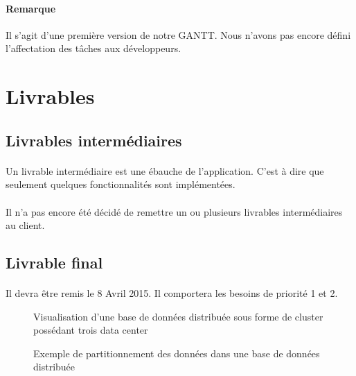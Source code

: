 \documentclass[12pt]{article}
\begin{document}
 \vspace{1cm}
 
\paragraph{Remarque} Il s'agit d'une première version de notre GANTT. Nous n'avons pas encore défini l'affectation des tâches aux développeurs.


\newpage

\section{Livrables}

\subsection{Livrables intermédiaires}

\paragraph{} Un livrable intermédiaire est une ébauche de l'application. C'est à dire que seulement quelques fonctionnalités sont implémentées.

\paragraph{} Il n'a pas encore été décidé de remettre un ou plusieurs livrables intermédiaires au client.

\subsection{Livrable final}

\paragraph{} Il devra être remis le 8 Avril 2015. Il comportera les besoins de priorité 1 et 2.



\begin{figure}[p]
	\centering
		
	\caption{Visualisation d'une base de données distribuée sous forme de cluster possédant trois data center\label{fig:distributed_database}}
\end{figure}

\begin{figure}[p]
	\centering
		
	\caption{Exemple de partitionnement des données dans une base de données distribuée\label{fig:partitionning}}
\end{figure}
\end{document}

